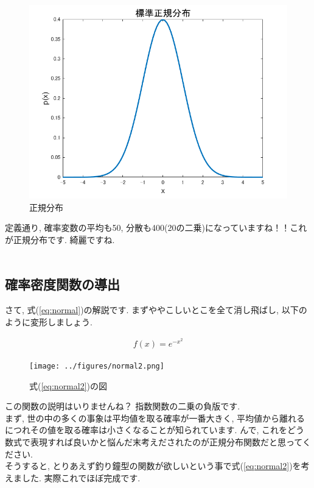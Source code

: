 \documentclass[11pt,a4paper,uplatex]{ujreport} 	%
\begin{document}
\begin{figure}[H]
\label{im:normal}
  \centering
  \includegraphics[width=120mm,bb=0 0 432 288]{../figures/normal.png}
  \caption{正規分布}
\end{figure}

定義通り, 確率変数の平均も50, 分散も400(20の二乗)になっていますね！！これが正規分布です. 綺麗ですね.\\
\\
\subsection{確率密度関数の導出}
さて, 式(\ref{eq:normal})の解説です. まずややこしいとこを全て消し飛ばし, 以下のように変形しましょう. 

\begin{align}
\label{eq:normal2}
f(x) = e^{-x^2}
\end{align}

\begin{figure}[H]
\label{im:normal}
  \centering
  \texttt{[image: ../figures/normal2.png]}
  \caption{式(\ref{eq:normal2})の図}
\end{figure}

この関数の説明はいりませんね？ 指数関数の二乗の負版です.\\

まず, 世の中の多くの事象は平均値を取る確率が一番大きく, 平均値から離れるにつれその値を取る確率は小さくなることが知られています. んで, これをどう数式で表現すれば良いかと悩んだ末考えだされたのが正規分布関数だと思ってください.\\

そうすると, とりあえず釣り鐘型の関数が欲しいという事で式(\ref{eq:normal2})を考えました. 実際これでほぼ完成です.\\
\end{document}
